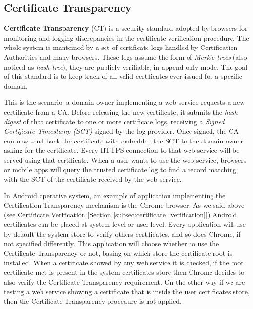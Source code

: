 		\subsection{Certificate Transparency}
		\label{subsec:certification_transparency}
			\par \textbf{Certificate Transparency} (CT) is a security standard adopted by browsers for monitoring and logging discrepancies in the certificate verification procedure. The whole system is manteined by a set of certificate logs handled by Certification Authorities and many browsers. These logs assume the form of \textit{Merkle trees} (also noticed as \textit{hash tree}), they are publicly verifiable, in append-only mode. The goal of this standard is to keep track of all valid certificates ever issued for a specific domain. \newline
			\par	This is the scenario: a domain owner implementing a web service requests a new certificate from a CA. Before releasing the new certificate, it submits the \textit{hash digest} of that certificate to one or more certificate logs, receiving a \textit{Signed Certificate Timestamp (SCT)} signed by the log provider. Once signed, the CA can now send back the certificate with embedded the SCT to the domain owner asking for the certificate. Every HTTPS connection to that web service will be served using that certificate. When a user wants to use the web service, browsers or mobile apps will query the trusted certificate log to find a record matching with the SCT of the certificate received by the web service. \newline
			\par In Android operative system, an example of application implementing the Certification Transparency mechanism is the Chrome browser. As we said above (see Certificate Verification [Section \ref{subsec:certificate_verification}]) Android certificates can be placed at system level or user level. Every application will use by default the system store to verify others certificates, and so does Chrome, if not specified differently. This application will choose whether to use the Certificate Transparency or not, basing on which store the certificate root is installed. When a certificate showed by any web service it is checked, if the root certificate met is present in the system certificates store then Chrome decides to also verify the Certificate Transparency requirement. On the other way if we are testing a web service showing a certificate that is inside the user certificates store, then the Certificate Transparency procedure is not applied.\newline 
			
